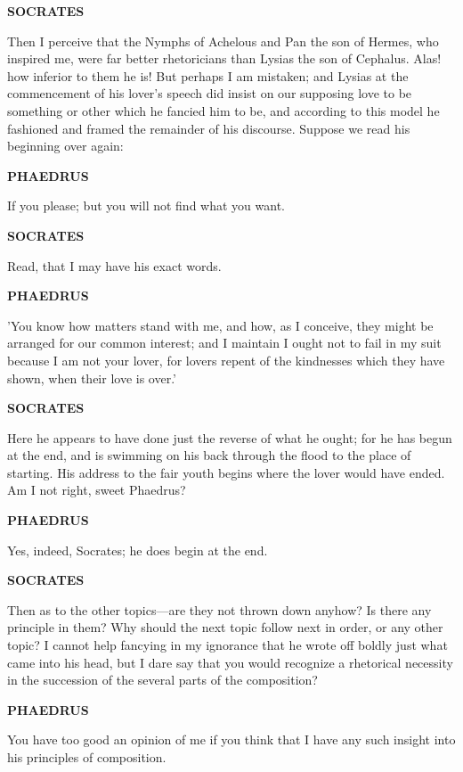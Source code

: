 \documentclass[11pt,letter]{article}
\begin{document}
\par \textbf{SOCRATES}
\par   Then I perceive that the Nymphs of Achelous and Pan the son of Hermes, who inspired me, were far better rhetoricians than Lysias the son of Cephalus. Alas! how inferior to them he is! But perhaps I am mistaken; and Lysias at the commencement of his lover's speech did insist on our supposing love to be something or other which he fancied him to be, and according to this model he fashioned and framed the remainder of his discourse. Suppose we read his beginning over again:

\par \textbf{PHAEDRUS}
\par   If you please; but you will not find what you want.

\par \textbf{SOCRATES}
\par   Read, that I may have his exact words.

\par \textbf{PHAEDRUS}
\par   'You know how matters stand with me, and how, as I conceive, they might be arranged for our common interest; and I maintain I ought not to fail in my suit because I am not your lover, for lovers repent of the kindnesses which they have shown, when their love is over.'

\par \textbf{SOCRATES}
\par   Here he appears to have done just the reverse of what he ought; for he has begun at the end, and is swimming on his back through the flood to the place of starting. His address to the fair youth begins where the lover would have ended. Am I not right, sweet Phaedrus?

\par \textbf{PHAEDRUS}
\par   Yes, indeed, Socrates; he does begin at the end.

\par \textbf{SOCRATES}
\par   Then as to the other topics—are they not thrown down anyhow? Is there any principle in them? Why should the next topic follow next in order, or any other topic? I cannot help fancying in my ignorance that he wrote off boldly just what came into his head, but I dare say that you would recognize a rhetorical necessity in the succession of the several parts of the composition?

\par \textbf{PHAEDRUS}
\par   You have too good an opinion of me if you think that I have any such insight into his principles of composition.
\end{document}

